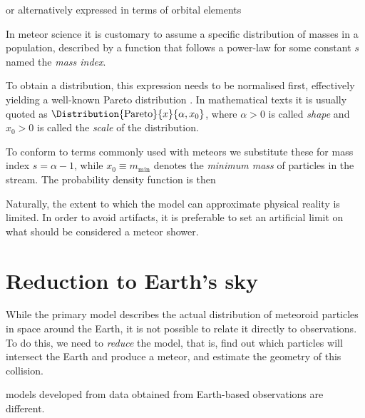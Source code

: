     or alternatively expressed in terms of orbital elements

    In meteor science it is customary to assume a specific distribution of masses in a population,
    described by a function that follows a power-law
    for some constant $s$ named the \emph{mass index}.

    To obtain a distribution, this expression needs to be normalised first,
    effectively yielding a well-known Pareto distribution \citep{arnold1983}.
    In mathematical texts it is usually quoted as $\Distribution{\mathrm{Pareto}}{x}{\alpha, x_0}$,
    where $\alpha > 0$ is called \emph{shape} and $x_0 > 0$ is called the \emph{scale} of the distribution.

    To conform to terms commonly used with meteors we substitute these for mass index
    $s = \alpha - 1$, while $x_0 \equiv m_\mathrm{min}$ denotes the \emph{minimum mass} of particles in the stream.
    The probability density function is then 

    Naturally, the extent to which the model can approximate physical reality is limited.
    In order to avoid artifacts, it is preferable to set an artificial limit on what should be considered
    a meteor shower.




\section{Reduction to Earth's sky} \label{ir}
    While the primary model describes the actual distribution of meteoroid particles in space around the Earth,
    it is not possible to relate it directly to observations. To do this, we need to \emph{reduce} the model,
    that is, find out which particles will intersect the Earth and produce a meteor, and estimate the geometry of this collision.


    models developed from data obtained from Earth-based observations are different.







